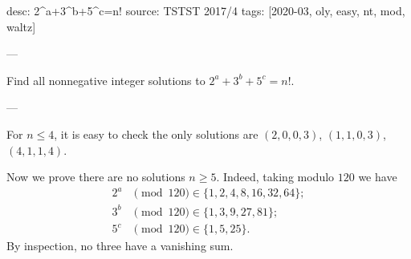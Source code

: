 desc: 2^a+3^b+5^c=n!
source: TSTST 2017/4
tags: [2020-03, oly, easy, nt, mod, waltz]

---

Find all nonnegative integer solutions to $2^a+3^b+5^c=n!$.

---

For $n\le4$, it is easy to check the only solutions are $(2,0,0,3)$, $(1,1,0,3)$, $(4,1,1,4)$.

Now we prove there are no solutions $n\ge5$. Indeed, taking modulo $120$ we have
\begin{align*}
    2^a&\pmod{120}\in\{1,2,4,8,16,32,64\};\\
    3^b&\pmod{120}\in\{1,3,9,27,81\};\\
    5^c&\pmod{120}\in\{1,5,25\}.
\end{align*}
By inspection, no three have a vanishing sum.
